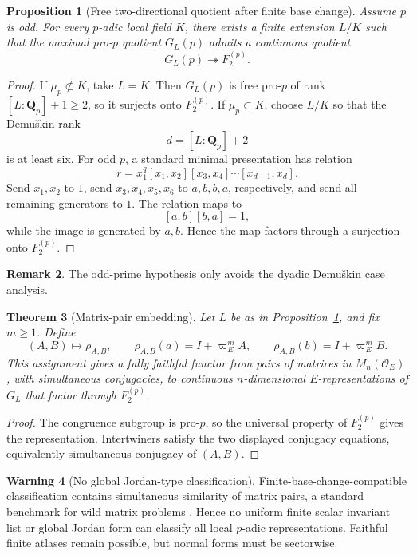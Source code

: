 \documentclass[11pt]{article}
\newtheorem{theorem}{Theorem}[section]
\newtheorem{proposition}[theorem]{Proposition}
\theoremstyle{definition}
\newtheorem{remark}[theorem]{Remark}
\newtheorem{warning}[theorem]{Warning}
\newcommand{\Qp}{\mathbf Q_p}
\begin{document}
\begin{proposition}[Free two-directional quotient after finite base change]\label{prop:free-two-quotient}
Assume $p$ is odd.  For every $p$-adic local field $K$, there exists a finite extension $L/K$ such that the maximal pro-$p$ quotient $G_L(p)$ admits a continuous quotient
\[
G_L(p)\twoheadrightarrow F_2^{(p)}.
\]
\end{proposition}

\begin{proof}
If $\mu_p\not\subset K$, take $L=K$.  Then $G_L(p)$ is free pro-$p$ of rank $[L:\Qp]+1\geq2$, so it surjects onto $F_2^{(p)}$.  If $\mu_p\subset K$, choose $L/K$ so that the Demu\v{s}kin rank
\[
d=[L:\Qp]+2
\]
is at least six.  For odd $p$, a standard minimal presentation has relation \cite{NSW}
\[
r=x_1^q[x_1,x_2][x_3,x_4]\cdots[x_{d-1},x_d].
\]
Send $x_1,x_2$ to $1$, send $x_3,x_4,x_5,x_6$ to $a,b,b,a$, respectively, and send all remaining generators to $1$.  The relation maps to
\[
[a,b][b,a]=1,
\]
while the image is generated by $a,b$.  Hence the map factors through a surjection onto $F_2^{(p)}$.
\end{proof}

\begin{remark}
The odd-prime hypothesis only avoids the dyadic Demu\v{s}kin case analysis.
\end{remark}

\begin{theorem}[Matrix-pair embedding]\label{thm:matrix-pair-embedding}
Let $L$ be as in Proposition~\ref{prop:free-two-quotient}, and fix $m\geq1$.  Define
\[
(A,B)\longmapsto \rho_{A,B},
\qquad
\rho_{A,B}(a)=I+\varpi_E^mA,
\qquad
\rho_{A,B}(b)=I+\varpi_E^mB.
\]
This assignment gives a fully faithful functor from pairs of matrices in $M_n(\mathcal O_E)$, with simultaneous conjugacies, to continuous $n$-dimensional $E$-representations of $G_L$ that factor through $F_2^{(p)}$.
\end{theorem}

\begin{proof}
The congruence subgroup is pro-$p$, so the universal property of $F_2^{(p)}$ gives the representation.  Intertwiners satisfy the two displayed conjugacy equations, equivalently simultaneous conjugacy of $(A,B)$.
\end{proof}

\begin{warning}[No global Jordan-type classification]\label{warn:wild-normal-form}
Finite-base-change-compatible classification contains simultaneous similarity of matrix pairs, a standard benchmark for wild matrix problems \cite{BelitskiiSergeichuk}.  Hence no uniform finite scalar invariant list or global Jordan form can classify all local $p$-adic representations.  Faithful finite atlases remain possible, but normal forms must be sectorwise.
\end{warning}
\end{document}
